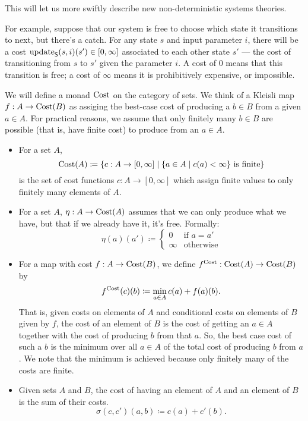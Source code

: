 \documentclass[DynamicalBook]{subfiles}
\begin{document}
This will let us more swiftly describe new non-deterministic systems theories.

For
example, suppose that our system is free to choose which state it transitions
to next, but there's a catch. For any state $s$ and input parameter $i$, there
will be a cost $\mathrm{update}_{\mathsf{S}}(s, i)(s') \in [0, \infty]$ associated to each other state $s'$ ---
the cost of transitioning from $s$ to $s'$ given the parameter $i$. A cost of
$0$ means that this transition is free; a cost of $\infty$ means it is
prohibitively expensive, or impossible.


\begin{definition}\label{def.cost_monad}
  We will define a monad $\mathrm{Cost}$ on the category of sets. We think of a Kleisli map $f : A \to \mathrm{Cost} ( B )$ as
  assiging the best-case cost of producing a $b \in B$ from a given $a \in A$.
  For practical reasons, we assume that only finitely many $b \in B$ are
  possible (that is, have finite cost) to produce from an $a \in A$.

  \begin{itemize}
  \item For a set $A$,
    \[
\mathrm{Cost}(A) \coloneqq \{c : A \to [0, \infty] \mid \mbox{$\{a \in A \mid c(a) <
  \infty\}$ is finite}\}
    \]
    is the set of cost functions $c : A \to [0, \infty]$ which assign finite
    values to only finitely many elements of $A$.
  \item For a set $A$, $\eta : A \to \mathrm{Cost}(A)$ assumes that we
    can only produce what we have, but that if we already have it, it's free. Formally:
\[
\eta(a)(a') \coloneqq \begin{cases} 0 &\mbox{if $a = a'$} \\
  \infty &\mbox{otherwise}\end{cases}
\]

  \item For a map with cost $f : A \to \mathrm{Cost}(B)$, we define
      $f^{\mathrm{Cost}} : \mathrm{Cost}(A) \to \mathrm{Cost}(B)$ by
      \[
f^{\mathrm{Cost}}(c)(b) \coloneqq \min_{a \in A} c(a) + f(a)(b).
      \]
That is, given costs on elements of $A$ and conditional costs on elements of $B$
given by $f$, the cost of an element of $B$ is the cost of getting an $a \in A$
together with the cost of producing $b$ from that $a$. So, the best case cost of
such a $b$ is the minimum over all $a \in A$ of the total cost of producing $b$
from $a$. We note that the minimum is achieved because only finitely many of the
costs are finite.
  \item Given sets $A$ and $B$, the cost of having an element of $A$ and an
    element of $B$ is the sum of their costs.
    $$\sigma(c, c')(a, b) \coloneqq c(a) + c'(b).$$
  \end{itemize}
\end{definition}
\end{document}

